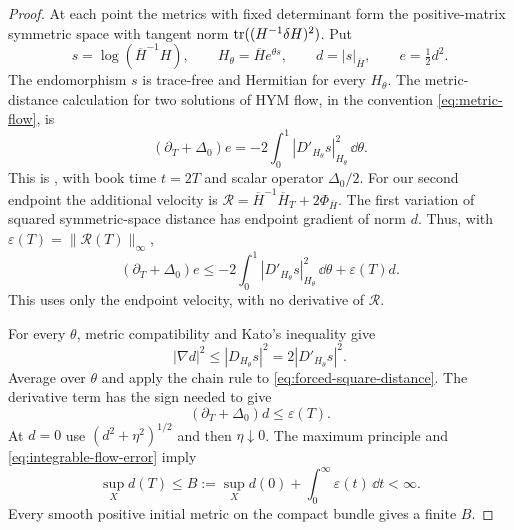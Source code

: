 \begin{proof}
At each point the metrics with fixed determinant form the
positive-matrix symmetric space with tangent norm
\(\operatorname{tr}((H^{-1}\delta H)^2)\). Put
\[
 s=\log(\overline H^{-1}H),\qquad
 H_\theta=\overline He^{\theta s},\qquad
 d=|s|_{\overline H},\qquad e=\tfrac12d^2.
\]
The endomorphism \(s\) is trace-free and Hermitian for every
\(H_\theta\). The metric-distance calculation for two
solutions of HYM flow, in the convention
\eqref{eq:metric-flow}, is
\[
 (\partial_T+\Delta_0)e
 =-2\int_0^1|D'_{H_\theta}s|_{H_\theta}^2\,\dd\theta.
\]
This is \cite[Lemma~6.4.5]{Kobayashi87}, with book time
\(t=2T\) and scalar operator \(\Delta_0/2\).
For our second endpoint the additional velocity is
\(\mathcal R=\overline H^{-1}\overline H_T+2\Phi_{\overline H}\).
The first variation of squared symmetric-space distance
has endpoint gradient of norm \(d\). Thus, with
\(\varepsilon(T)=\|\mathcal R(T)\|_\infty\),
\begin{equation}\label{eq:forced-square-distance}
 (\partial_T+\Delta_0)e
 \le-2\int_0^1|D'_{H_\theta}s|_{H_\theta}^2\,\dd\theta
       +\varepsilon(T)d.
\end{equation}
This uses only the endpoint velocity, with no derivative
of \(\mathcal R\).

For every \(\theta\), metric compatibility and Kato's
inequality give
\[
 |\nabla d|^2\le|D_{H_\theta}s|^2
              =2|D'_{H_\theta}s|^2.
\]
Average over \(\theta\) and apply the chain rule to
\eqref{eq:forced-square-distance}. The derivative term
has the sign needed to give
\begin{equation}\label{eq:forced-distance}
 (\partial_T+\Delta_0)d\le\varepsilon(T).
\end{equation}
At \(d=0\) use \((d^2+\eta^2)^{1/2}\) and then
\(\eta\downarrow0\). The maximum principle and
\eqref{eq:integrable-flow-error} imply
\begin{equation}\label{eq:bounded-distance}
 \sup_Xd(T)\le
 B:=\sup_Xd(0)+\int_0^\infty\varepsilon(t)\,\dd t<\infty.
\end{equation}
Every smooth positive initial metric on the compact
bundle gives a finite \(B\).


\end{proof}
